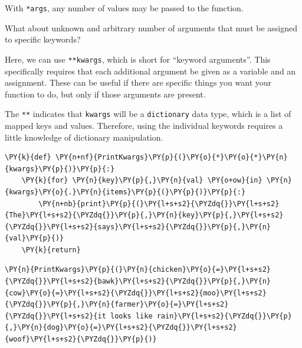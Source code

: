     With \texttt{*args}, any number of values may be passed to the function.

What about unknown and arbitrary number of arguments that must be
assigned to specific keywords?

Here, we can use \texttt{**kwargs}, which is short for ``keyword
arguments''. This specifically requires that each additional argument be
given as a variable and an assignment. These can be useful if there are
specific things you want your function to do, but only if those
arguments are present.

The \texttt{**} indicates that \texttt{kwargs} will be a
\texttt{dictionary} data type, which is a list of mapped keys and
values. Therefore, using the individual keywords requires a little
knowledge of dictionary manipulation.

    \begin{tcolorbox}[breakable, size=fbox, boxrule=1pt, pad at break*=1mm,colback=cellbackground, colframe=cellborder]
\begin{Verbatim}[commandchars=\\\{\}]
\PY{k}{def} \PY{n+nf}{PrintKwargs}\PY{p}{(}\PY{o}{*}\PY{o}{*}\PY{n}{kwargs}\PY{p}{)}\PY{p}{:}
    \PY{k}{for} \PY{n}{key}\PY{p}{,}\PY{n}{val} \PY{o+ow}{in} \PY{n}{kwargs}\PY{o}{.}\PY{n}{items}\PY{p}{(}\PY{p}{)}\PY{p}{:}
        \PY{n+nb}{print}\PY{p}{(}\PY{l+s+s2}{\PYZdq{}}\PY{l+s+s2}{The}\PY{l+s+s2}{\PYZdq{}}\PY{p}{,}\PY{n}{key}\PY{p}{,}\PY{l+s+s2}{\PYZdq{}}\PY{l+s+s2}{says}\PY{l+s+s2}{\PYZdq{}}\PY{p}{,}\PY{n}{val}\PY{p}{)}
    \PY{k}{return}
\end{Verbatim}
\end{tcolorbox}

    \begin{tcolorbox}[breakable, size=fbox, boxrule=1pt, pad at break*=1mm,colback=cellbackground, colframe=cellborder]
\begin{Verbatim}[commandchars=\\\{\}]
\PY{n}{PrintKwargs}\PY{p}{(}\PY{n}{chicken}\PY{o}{=}\PY{l+s+s2}{\PYZdq{}}\PY{l+s+s2}{bawk}\PY{l+s+s2}{\PYZdq{}}\PY{p}{,}\PY{n}{cow}\PY{o}{=}\PY{l+s+s2}{\PYZdq{}}\PY{l+s+s2}{moo}\PY{l+s+s2}{\PYZdq{}}\PY{p}{,}\PY{n}{farmer}\PY{o}{=}\PY{l+s+s2}{\PYZdq{}}\PY{l+s+s2}{it looks like rain}\PY{l+s+s2}{\PYZdq{}}\PY{p}{,}\PY{n}{dog}\PY{o}{=}\PY{l+s+s2}{\PYZdq{}}\PY{l+s+s2}{woof}\PY{l+s+s2}{\PYZdq{}}\PY{p}{)}
\end{Verbatim}
\end{tcolorbox}

